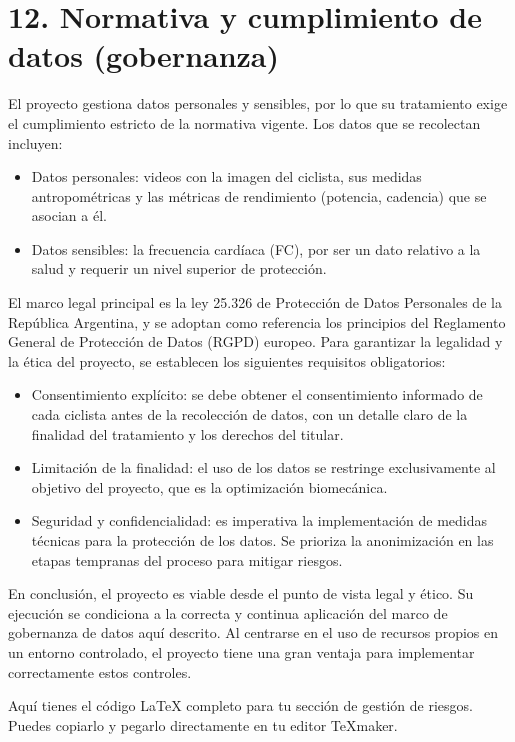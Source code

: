 \documentclass[
11pt, %
]{charter}
\begin{document}
\section{12. Normativa y cumplimiento de datos (gobernanza)}

El proyecto gestiona datos personales y sensibles, por lo que su tratamiento exige el cumplimiento estricto de la normativa vigente. Los datos que se recolectan incluyen:
\begin{itemize}
    \item Datos personales: videos con la imagen del ciclista, sus medidas antropométricas y las métricas de rendimiento (potencia, cadencia) que se asocian a él.
    \item Datos sensibles: la frecuencia cardíaca (FC), por ser un dato relativo a la salud y requerir un nivel superior de protección.
\end{itemize}

El marco legal principal es la ley 25.326 de Protección de Datos Personales de la República Argentina, y se adoptan como referencia los principios del Reglamento General de Protección de Datos (RGPD) europeo. Para garantizar la legalidad y la ética del proyecto, se establecen los siguientes requisitos obligatorios:
\begin{itemize}
    \item Consentimiento explícito: se debe obtener el consentimiento informado de cada ciclista antes de la recolección de datos, con un detalle claro de la finalidad del tratamiento y los derechos del titular.
    \item Limitación de la finalidad: el uso de los datos se restringe exclusivamente al objetivo del proyecto, que es la optimización biomecánica.
    \item Seguridad y confidencialidad: es imperativa la implementación de medidas técnicas para la protección de los datos. Se prioriza la anonimización en las etapas tempranas del proceso para mitigar riesgos.
\end{itemize}

En conclusión, el proyecto es viable desde el punto de vista legal y ético. Su ejecución se condiciona a la correcta y continua aplicación del marco de gobernanza de datos aquí descrito. Al centrarse en el uso de recursos propios en un entorno controlado, el proyecto tiene una gran ventaja para implementar correctamente estos controles.


Aquí tienes el código LaTeX completo para tu sección de gestión de riesgos. Puedes copiarlo y pegarlo directamente en tu editor TeXmaker.
\end{document}

